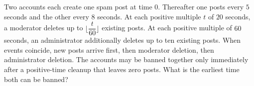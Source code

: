 Two accounts each create one spam post at time $0$. Thereafter one posts every $5$ seconds and the other every $8$ seconds. At each positive multiple $t$ of $20$ seconds, a moderator deletes up to $\lfloor\dfrac{t}{60}\rfloor$ existing posts. At each positive multiple of $60$ seconds, an administrator additionally deletes up to ten existing posts. When events coincide, new posts arrive first, then moderator deletion, then administrator deletion. The accounts may be banned together only immediately after a positive-time cleanup that leaves zero posts. What is the earliest time both can be banned?

